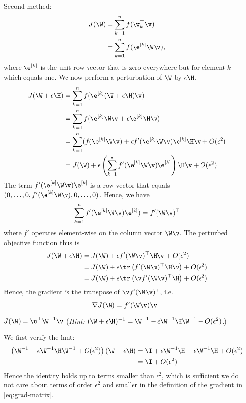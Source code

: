 \begin{exenumerate}
\begin{solution}
    Second method:
    \begin{align}
      J(\W) &= \sum_{k=1}^n f(\w_k^\top\v)\\
            &= \sum_{k=1}^n f(\e^{[k]}\W\v),
    \end{align}
    where $\e^{[k]}$ is the unit row vector that is zero everywhere but for element $k$ which equals one. We now perform a perturbation of $\W$ by $\epsilon \H$.
    \begin{align}
J(\W + \epsilon \H) &= \sum_{k=1}^n f(\e^{[k]}(\W + \epsilon \H)\v) \\
                    &= \sum_{k=1}^n f(\e^{[k]}\W\v + \epsilon\e^{[k]}\H\v) \\
         					  &= \sum_{k=1}^n (f(\e^{[k]}\W\v) + \epsilon f'(\e^{[k]}\W\v)\e^{[k]}\H\v + O(\epsilon^2)\\
                    &= J(\W) + \epsilon \left( \sum_{k=1}^n  f'(\e^{[k]}\W\v)\e^{[k]}\right) \H \v + O(\epsilon^2)
    \end{align}
    The term $f'(\e^{[k]}\W\v) \e^{[k]}$ is a row vector that equals $(0, \ldots, 0,f'(\e^{[k]}\W\v), 0, \ldots, 0)$. Hence, we have
    \begin{equation}
      \sum_{k=1}^n  f'(\e^{[k]}\W\v)\e^{[k]}) = f'(\W\v)^\top
    \end{equation}
    where $f'$ operates element-wise on the column vector $\W\v$. The perturbed objective function thus is
    \begin{align}
      J(\W + \epsilon \H) & = J(\W) + \epsilon f'(\W\v)^\top \H \v  + O(\epsilon^2)\\
                          & =  J(\W) + \epsilon \tr\left(f'(\W\v)^\top \H \v\right)  + O(\epsilon^2)\\
                          & =  J(\W) + \epsilon \tr\left(\v f'(\W\v)^\top \H \right)  + O(\epsilon^2)
    \end{align}
    Hence, the gradient is the transpose of $\v f'(\W\v)^\top$, i.e.\
    \begin{equation}
      \nabla J(\W) = f'(\W\v) \v^\top
\end{equation}
\end{solution}

\item $J(\W) = \u^\top \W^{-1}\v$ (\emph{Hint: $(\W+\epsilon \H)^{-1} = \W^{-1} -\epsilon \W^{-1}\H\W^{-1}+O(\epsilon^2)$.})
  \begin{solution}
    We first verify the hint:
    \begin{align}
      \left(\W^{-1} -\epsilon \W^{-1}\H\W^{-1}+O(\epsilon^2)\right) (\W+\epsilon \H)&=  \I + \epsilon \W^{-1} \H - \epsilon \W^{-1}\H + O(\epsilon^2)\\
                                                                                    &= \I + O(\epsilon^2)
    \end{align}
    Hence the identity holds up to terms smaller than $\epsilon^2$, which is
    sufficient we do not care about terms of order $\epsilon^2$ and smaller 
    in the definition of the gradient in \eqref{eq:grad-matrix}.
    

\end{solution}
\end{exenumerate}
